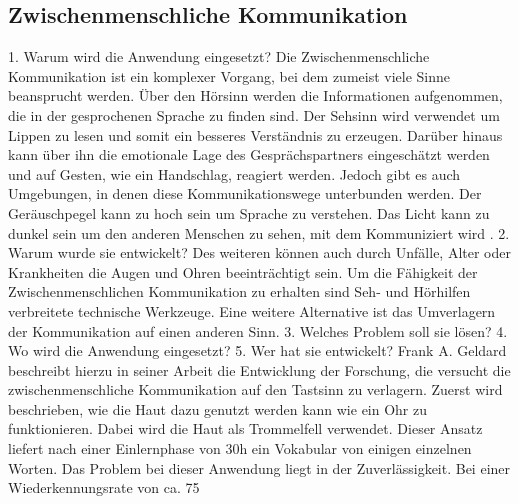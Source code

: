 \documentclass{llncs}					%
\begin{document}
\subsection{Zwischenmenschliche Kommunikation}
1.	Warum wird die Anwendung eingesetzt?
Die Zwischenmenschliche Kommunikation ist ein komplexer Vorgang, bei dem zumeist viele Sinne beansprucht werden. Über den Hörsinn werden die Informationen aufgenommen, die in der gesprochenen Sprache zu finden sind. Der Sehsinn wird verwendet um Lippen zu lesen und somit ein besseres Verständnis zu erzeugen. Darüber hinaus kann über ihn die emotionale Lage des Gesprächspartners eingeschätzt werden und auf Gesten, wie ein Handschlag, reagiert werden.
Jedoch gibt es auch Umgebungen, in denen diese Kommunikationswege unterbunden werden. Der Geräuschpegel kann zu hoch sein um Sprache zu verstehen. Das Licht kann zu dunkel sein um den anderen Menschen zu sehen, mit dem Kommuniziert wird \cite{10.2307/1705360}.
2.	Warum wurde sie entwickelt?
Des weiteren können auch durch Unfälle, Alter oder Krankheiten die Augen und Ohren beeinträchtigt sein. Um die Fähigkeit der Zwischenmenschlichen Kommunikation zu erhalten sind Seh- und Hörhilfen verbreitete technische Werkzeuge. Eine weitere Alternative ist das Umverlagern der Kommunikation auf einen anderen Sinn\cite{10.2307/1705360}.
3.	Welches Problem soll sie lösen?
4.	Wo wird die Anwendung eingesetzt?
5.	Wer hat sie entwickelt?
Frank A. Geldard \cite{10.2307/1705360} beschreibt hierzu in seiner Arbeit die Entwicklung der Forschung, die versucht die zwischenmenschliche Kommunikation auf den Tastsinn zu verlagern. Zuerst wird beschrieben, wie die Haut dazu genutzt werden kann wie ein Ohr zu funktionieren. Dabei wird die Haut als Trommelfell verwendet. Dieser Ansatz liefert nach einer Einlernphase von 30h ein Vokabular von einigen einzelnen Worten\cite{10.2307/1705360}. Das Problem bei dieser Anwendung liegt in der Zuverlässigkeit. Bei einer Wiederkennungsrate von ca. 75%
\end{document}
